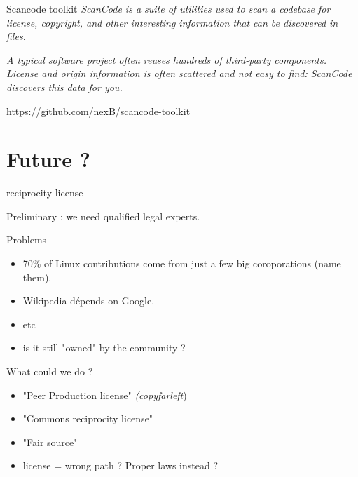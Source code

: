 \documentclass{beamer}
\begin{document}

\begin{frame}{Scancode toolkit}
\textit{ ScanCode is a suite of utilities used to scan a codebase for license, copyright, and other interesting information that can be discovered in files.}

\textit{A typical software project often reuses hundreds of third-party components. License and origin information is often scattered and not easy to find: ScanCode discovers this data for you.}

\url{https://github.com/nexB/scancode-toolkit}
\end{frame}

\begin{frame}[plain]%
%  
\end{frame}



\section{Future ?}

\begin{frame}{reciprocity license}

Preliminary : we need qualified legal experts.

  \begin{block}{Problems}
    \begin{itemize}
    \item 70\% of Linux contributions come from just a few big coroporations (name them). 
    \item Wikipedia dépends on Google.
    \item etc
    \item is it still "owned" by the community ? 
    \end{itemize}
  \end{block}

  \begin{block}{What could we do ?}
    \begin{itemize}
    \item "Peer Production license" \textit{(copyfarleft})
    \item "Commons reciprocity license"
    \item "Fair source"
    \item license = wrong path ? Proper laws instead ?
    \end{itemize}
  
  \end{block}
  
 
\end{frame}
\end{document}
